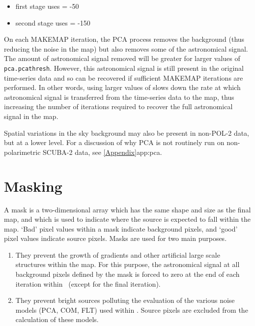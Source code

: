 \begin{itemize}
\item first stage uses  = -50
\item second stage uses  = -150
\end{itemize}

On each MAKEMAP iteration, the PCA process removes the background (thus
reducing the noise in the map) but also removes some of the astronomical
signal. The amount of astronomical signal removed will be greater for
larger values of \texttt{pca.pcathresh}. However, this astronomical
signal is still present in the original time-series data and so can be
recovered if sufficient MAKEMAP iterations are performed. In other words,
using larger values of  slows down the rate at
which astronomical signal is transferred from the time-series data to the
map, thus increasing the number of iterations required to recover the
full astronomical signal in the map.

Spatial variations in the sky background may also be present in non-POL-2
data, but at a lower level. For a discussion of why PCA is not routinely
run on non-polarimetric SCUBA-2 data, see \cref{Appendix}{app:pca}{}.



\section{Masking}
A mask is a two-dimensional array which has the same shape and size as
the final map, and which is used to indicate where the source is
expected to fall within the map. `Bad' pixel values within a mask
indicate background pixels, and `good' pixel values indicate source
pixels. Masks are used for two main purposes.

\begin{enumerate}
\item They prevent the growth of gradients and other artificial large
  scale structures within the map.  For this purpose, the astronomical
  signal at all background pixels defined by the mask is forced to
  zero at the end of each iteration within \makemap\ (except for the
  final iteration).
\item They prevent bright sources polluting the evaluation of the
  various noise models (PCA, COM, FLT) used within \makemap. Source
  pixels are excluded from the calculation of these models.
\end{enumerate}


